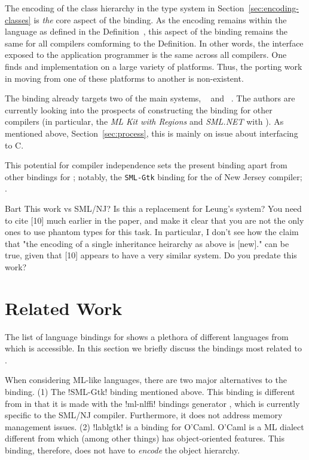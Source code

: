 \documentclass[workingdraft]{usetex-v1}
\begin{document}
The encoding of the \gtk class hierarchy in the \sml type system in
Section~\ref{sec:encoding-classes} is \emph{the} core aspect of the
binding. As the encoding remains within the language as defined in the
Definition~\cite{Milner:1997:Definition}, this aspect of the binding
remains the same for all \sml compilers comforming to the Definition.
In other words, the interface exposed to the application programmer is
the same across all compilers.
%
One finds \sml and \gtk implementation on a large variety of
platforms. Thus, the porting work in moving from one of these
platforms to another is non-existent.

The \mgtk binding already targets two of the main \sml systems,
\mosml~\cite{Mosml-webpage:2003} and \mlton~\cite{MLton-webpage:2003}.
The authors are currently looking into the prospects of constructing
the binding for other \sml compilers (in particular, the \emph{ML Kit
  with Regions} \cite{MLKit-webpage:2003} and \emph{SML.NET}
\cite{SML.NET-webpage:2003} with \gtksharp). As mentioned above,
Section~\ref{sec:process}, this is mainly on issue about interfacing
to C.

This potential for compiler independence sets the present binding
apart from other \gtk bindings for \sml; notably, the \texttt{SML-Gtk}
binding for the \sml of New Jersey compiler;
\cite{SML-Gtk-webpage:2003}.

\begin{ednote}{Bart}
  This work vs SML/NJ?  Is this a replacement for Leung's
system?  You need to cite [10] much earlier in the paper,
and make it clear that you are not the only ones to use
phantom types for this task.  In particular, I don't see how
the claim that "the encoding of a single inheritance
heirarchy as above is [new]." can be true, given that [10]
appears to have a very similar system.  Do you predate this
work?

\end{ednote}


\section{Related Work}
\label{sec:related-work}

The list of language bindings for \gtk shows a plethora of different
languages from which \gtk is accessible. In this section we briefly
discuss the bindings most related to \mgtk.

When considering ML-like languages, there are two major alternatives
to the \mgtk binding. (1) The !SML-Gtk! binding mentioned above.  This
binding is different from \mgtk in that it is made with the !ml-nlffi!
bindings generator \cite{Blume:2001:nlffi}, which is currently
specific to the SML/NJ compiler.  Furthermore, it does not address
memory management issues.
%
(2) !lablgtk! is a \gtk binding for O'Caml.
O'Caml is a ML dialect different from \sml which (among other things)
has object-oriented features. This binding, therefore, does not have
to \emph{encode} the \gtk object hierarchy.
\end{document}
